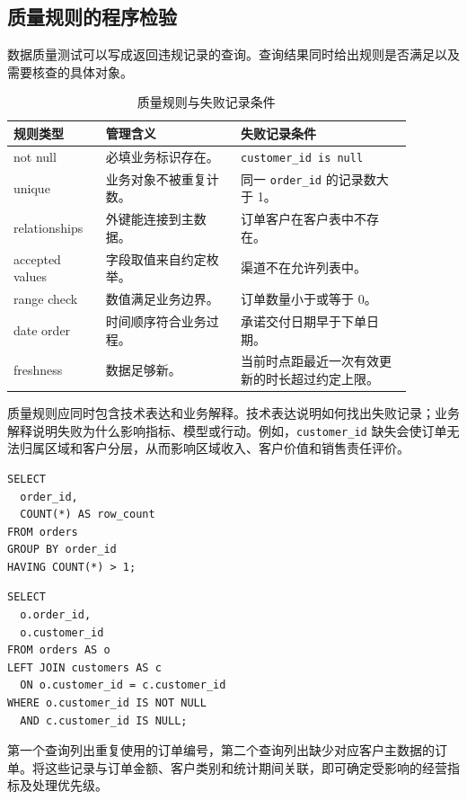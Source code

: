 \subsection{质量规则的程序检验}

数据质量测试可以写成返回违规记录的查询。查询结果同时给出规则是否满足以及需要核查的具体对象。

\begin{table}[htbp]
\centering
\caption{质量规则与失败记录条件}
\begin{tabular}{P{0.20\linewidth}P{0.30\linewidth}P{0.38\linewidth}}
\toprule
{}
规则类型 & 管理含义 & 失败记录条件\\
\midrule

not null & 必填业务标识存在。 & \texttt{customer\_id is null}\\
unique & 业务对象不被重复计数。 & 同一 \texttt{order\_id} 的记录数大于 1。\\
relationships & 外键能连接到主数据。 & 订单客户在客户表中不存在。\\
accepted values & 字段取值来自约定枚举。 & 渠道不在允许列表中。\\
range check & 数值满足业务边界。 & 订单数量小于或等于 0。\\
date order & 时间顺序符合业务过程。 & 承诺交付日期早于下单日期。\\
freshness & 数据足够新。 & 当前时点距最近一次有效更新的时长超过约定上限。\\
\bottomrule
\end{tabular}
\end{table}

质量规则应同时包含技术表达和业务解释。技术表达说明如何找出失败记录；业务解释说明失败为什么影响指标、模型或行动。例如，\texttt{customer\_id} 缺失会使订单无法归属区域和客户分层，从而影响区域收入、客户价值和销售责任评价。

\begin{lstlisting}[style=sqlstyle,caption={主键重复失败记录查询}]
SELECT
  order_id,
  COUNT(*) AS row_count
FROM orders
GROUP BY order_id
HAVING COUNT(*) > 1;
\end{lstlisting}

\begin{lstlisting}[style=sqlstyle,caption={客户外键失败记录查询}]
SELECT
  o.order_id,
  o.customer_id
FROM orders AS o
LEFT JOIN customers AS c
  ON o.customer_id = c.customer_id
WHERE o.customer_id IS NOT NULL
  AND c.customer_id IS NULL;
\end{lstlisting}

第一个查询列出重复使用的订单编号，第二个查询列出缺少对应客户主数据的订单。将这些记录与订单金额、客户类别和统计期间关联，即可确定受影响的经营指标及处理优先级。

